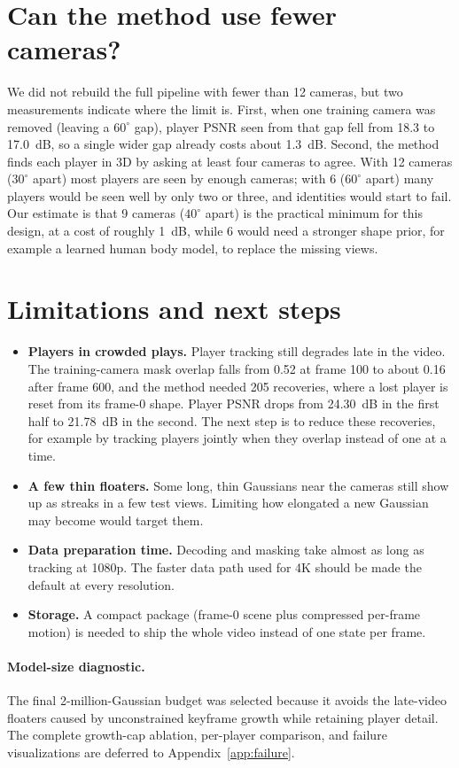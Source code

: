 \documentclass[11pt]{article}
\begin{document}
\section{Can the method use fewer cameras?}
We did not rebuild the full pipeline with fewer than 12 cameras, but two measurements indicate where
the limit is. First, when one training camera was removed (leaving a $60^\circ$ gap), player PSNR
seen from that gap fell from 18.3 to 17.0~dB, so a single wider gap already costs about 1.3~dB.
Second, the method finds each player in 3D by asking at least four cameras to agree. With 12 cameras
($30^\circ$ apart) most players are seen by enough cameras; with 6 ($60^\circ$ apart) many players
would be seen well by only two or three, and identities would start to fail. Our estimate is that
9 cameras ($40^\circ$ apart) is the practical minimum for this design, at a cost of roughly 1~dB,
while 6 would need a stronger shape prior, for example a learned human body model, to replace the
missing views.

\section{Limitations and next steps}
\begin{itemize}
\item \textbf{Players in crowded plays.} Player tracking still degrades late in the video. The
training-camera mask overlap falls from 0.52 at frame 100 to about 0.16 after frame 600, and the
method needed 205 recoveries, where a lost player is reset from its frame-0 shape. Player PSNR drops
from 24.30~dB in the first half to 21.78~dB in the second. The next step is to reduce these
recoveries, for example by tracking players jointly when they overlap instead of one at a time.
\item \textbf{A few thin floaters.} Some long, thin Gaussians near the cameras still show up as
streaks in a few test views. Limiting how elongated a new Gaussian may become would target them.
\item \textbf{Data preparation time.} Decoding and masking take almost as long as tracking at
1080p. The faster data path used for 4K should be made the default at every resolution.
\item \textbf{Storage.} A compact package (frame-0 scene plus compressed per-frame motion) is needed
to ship the whole video instead of one state per frame.
\end{itemize}

\paragraph{Model-size diagnostic.}
The final 2-million-Gaussian budget was selected because it avoids the late-video floaters caused
by unconstrained keyframe growth while retaining player detail. The complete growth-cap ablation,
per-player comparison, and failure visualizations are deferred to Appendix~\ref{app:failure}.
\end{document}
